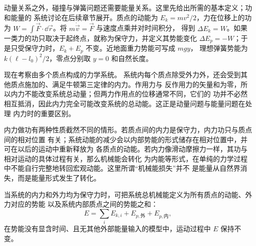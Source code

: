 {\newcommand{\soldiagFourTwenty}{%
\begin{center}\begin{minipage}{.97\linewidth}\centering
\begin{tikzpicture}[scale=.67]
  \node[solpanel] at (-3.55,1.55) {运动中};
  \draw[axis] (-5.0,0)--(-2.15,0) node[right,sollabel] {$x$};
  \draw[solbody,fill=SoftGray] (-3.75,-.35) rectangle (-3.05,.35);
  \draw[solforce] (-3.40,.65)--(-4.45,.65) node[left,sollabel] {$F_s$};
  \draw[solforce] (-3.40,-.65)--(-2.35,-.65) node[right,sollabel] {$f_k$};
  \node[sollabel] at (-3.40,-1.02) {向左运动、$x>0$};
  \node[solpanel] at (1.95,1.55) {停止后（图示 $x>0$）};
  \draw[axis] (.35,0)--(3.85,0) node[right,sollabel] {$x$};
  \draw[solbody,fill=SoftGray] (1.60,-.35) rectangle (2.30,.35);
  \draw[solforce] (1.95,.65)--(.90,.65) node[left,sollabel] {$F_s$};
  \draw[solforce] (1.95,-.65)--(3.00,-.65) node[right,sollabel] {$f_s$};
  \node[sollabel] at (1.95,-1.02) {$f_s$ 按平衡需要取值};
\end{tikzpicture}
\diagcaption{解图}{滑动摩擦反向于速度；静摩擦则反向于物体停止位置处的弹簧力。}\label{ch07:fig:soldiagFourTwenty}\end{minipage}\end{center}}


动量关系之外，碰撞与弹簧问题还需要能量关系。这里先给出所需的基本定义；功和能量的
系统讨论在后续章节展开。质点的动能为 $E_k=mv^2/2$，力在位移上的功为
$W=\int\vec F\cdot\dd\vec r$。将 $m\dot{\vec v}=\vec F$ 与速度点乘并对时间积分，
得到 $\Delta E_k=W$。如果一类力的功只取决于起终点，就称为保守力，并定义其势能变化
$\Delta E_p=-W$；于是只受保守力时，$E_k+E_p$ 不变。近地面重力势能可写成 $mgy$，
理想弹簧势能为 $k(\ell-l_0)^2/2$，零点分别取 $y=0$ 和自然长度。

现在考察由多个质点构成的力学系统。
系统内每个质点除受外力外，还会受到其他质点施加的、满足牛顿第三定律的内力。作用力与
反作用力的矢量和为零，所以内力不能改变系统总动量；但两力作用点的位移通常不同，它们的
功并不必然相互抵消，因此内力完全可能改变系统的总动能。这正是动量问题与能量问题在处理
内力时的重要区别。

内力做功有两种性质截然不同的情形。若质点间的内力是保守力，内力功只与质点间的相对位置
有关；系统动能的减少会以内部势能的形式储存在相对位置中，并可在以后的运动中重新释放为
各质点的动能。若内力像滑动摩擦力一样，其功与相对运动的具体过程有关，那么机械能会转化
为内能等形式，在单纯的力学过程中不能自行完整地转回宏观动能。这里所谓“机械能损失”并不
是能量从自然界消失，而是能量形式发生了转化。

当系统的内力和外力均为保守力时，可把系统总机械能定义为所有质点的动能、外力对应的势能
以及系统内部质点之间的势能之和：
\[
 E=\sum_i E_{k,i}+E_{p,\text{外}}+E_{p,\text{内}},
\]
在势能没有显含时间、且无其他外部能量输入的模型中，运动过程中 $E$ 保持不变。

}
